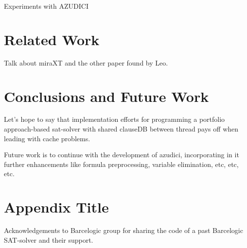 \documentclass{llncs}
\begin{document}
Experiments with AZUDICI

\section{Related Work}

Talk about miraXT and the other paper found by Leo.

\section{Conclusions and Future Work}

Let's hope to say that implementation efforts for programming a portfolio approach-based sat-solver with shared clauseDB between thread pays off when leading with cache problems.

Future work is to continue with the development of azudici, incorporating in it further enhancements like formula preprocessing, variable elimination, etc, etc, etc.

\appendix
\section{Appendix Title}

Acknowledgements to Barcelogic group for sharing the code of a past Barcelogic SAT-solver and their support. 




\end{document}

